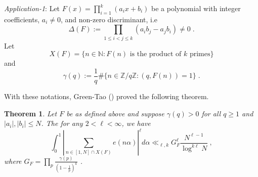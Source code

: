 \documentclass[12pt,article]{amsart}
\newtheorem{theorem}{Theorem}[section]
\theoremstyle{remark}
\numberwithin{equation}{section}
\begin{document}
	\vspace{2mm}
	\noindent\textit{Application-1}:  Let $F(x)=\prod_{i=1}^k (a_ix+b_i)$ be a polynomial with integer coefficients, $a_i\neq 0$, and  non-zero discriminant, i.e 
	\[\Delta(F):=\prod_{1\leq i<j\leq k}(a_ib_j-a_jb_i)\neq 0\;.\] 
	Let 
	\[
	X(F)=\{n\in \mathbb{N}: F(n) \text{ is the product of } k \text{ primes}\}
	\] and 
	\begin{equation}
		\label{gamma(q)}
		\gamma(q):=\frac{1}{q}\#\{n\in \mathbb{Z}/q\mathbb{Z}: (q, F(n))=1\}\; .
	\end{equation}
	
	With these notations, Green-Tao (\cite[Theorem~1.1]{Green-Tao*06}) proved the following theorem.
	
	\begin{theorem}
		\label{GT}
		Let $F$ be as defined above and suppose $\gamma(q)>0$ for all $q\geq 1$ and $|a_i|, |b_i|\leq N$. The for any $2<\ell<\infty$, we have 
		\[
		\int_{0}^1\left|\sum_{n\in [1,N]\cap X(F)}e(n\alpha)\right|^\ell d\alpha \ll_{\ell, k} G_F^\ell \frac{N^{\ell-1}}{\log^{k\ell} N}\; ,
		\]
		where $G_F=\prod_p \frac{\gamma(p)}{(1-\frac{1}{p})^k}$\; .
	\end{theorem}
	
\end{document}
